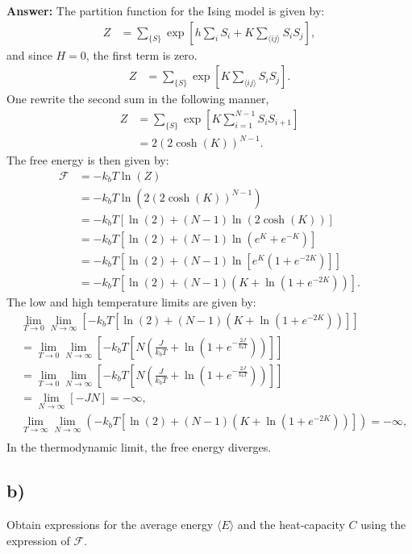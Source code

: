 \documentclass[a4paper]{article}
\newcommand{\newparagraph}{\vspace{.5cm}\noindent}
\newcommand{\average}[1]{\langle #1 \rangle}
\begin{document}
\newparagraph
\textbf{Answer:} The partition function for the Ising model is given by:
\begin{align*}
    Z &= \sum_{\{S\}}\exp\left[h\sum_i S_i + K\sum_{\average{ij}}S_iS_j\right],
\end{align*}and since $H = 0$, the first term is zero.
\begin{align*}
    Z &= \sum_{\{S\}}\exp\left[K\sum_{\average{ij}}S_iS_j\right].
\end{align*}One rewrite the second sum in the following manner,
\begin{align*}
    Z &= \sum_{\{S\}}\exp\left[K\sum_{i = 1}^{N - 1}S_iS_{i+1}\right]\\
    &= 2\left(2\cosh(K)\right)^{N-1}.
\end{align*}The free energy is then given by:
\begin{align*}
    \mathcal{F} &= -k_bT\ln(Z)\\
    &= -k_bT\ln\left(2\left(2\cosh(K)\right)^{N-1}\right)\\
    &= -k_bT\left[\ln(2) + (N-1)\ln\left(2\cosh(K)\right)\right]\\
    &= -k_bT\left[\ln(2) + (N-1)\ln\left(e^{K} + e^{-K}\right)\right]\\
    &= -k_bT\left[\ln(2) + (N-1)\ln\left[e^K\left(1 + e^{-2K}\right)\right]\right]\\
    &= -k_bT\left[\ln(2) + (N-1)\left(K + \ln\left(1 + e^{-2K}\right)\right)\right].
\end{align*}The low and high temperature limits are given by:
\begin{align*}
    &\lim_{T\to0}\lim_{N\to\infty}\left[-k_bT\left[\ln(2) + (N-1)\left(K + \ln\left(1 + e^{-2K}\right)\right)\right]\right]\\
    &= \lim_{T\to0}\lim_{N\to\infty}\left[-k_bT\left[N\left(\frac{J}{k_bT} + \ln\left(1 + e^{-\frac{2J}{k_bT}}\right)\right)\right]\right]\\
    &= \lim_{T\to0}\lim_{N\to\infty}\left[-k_bT\left[N\left(\frac{J}{k_bT} + \ln\left(1 + e^{-\frac{2J}{k_bT}}\right)\right)\right]\right]\\
    &= \lim_{N\to\infty}\left[-JN\right] = -\infty,\\
    &\lim_{T\to\infty}\lim_{N\to\infty}\left(-k_bT\left[\ln(2) + (N-1)\left(K + \ln\left(1 + e^{-2K}\right)\right)\right]\right) = -\infty,\\
\end{align*}In the thermodynamic limit, the free energy diverges.
\subsection*{b)}
Obtain expressions for the average energy $\average{E}$ and the heat-capacity $C$ using the expression of $\mathcal{F}$.
\end{document}
